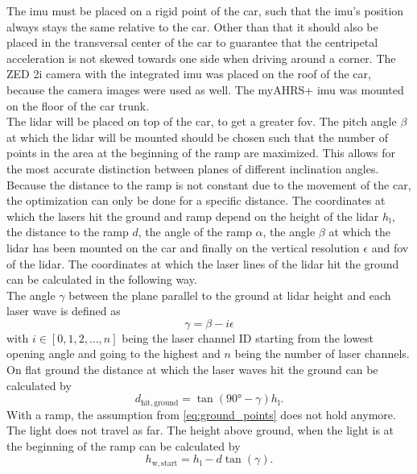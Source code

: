 The \gls{imu} must be placed on a rigid point of the car, such that the \gls{imu}'s position always stays the same relative to the car.
Other than that it should also be placed in the transversal center of the car to guarantee that the centripetal acceleration is not skewed towards one side when driving around a corner.
The ZED 2i camera with the integrated \gls{imu} was placed on the roof of the car, because the camera images were used as well.
The myAHRS+ \gls{imu} was mounted on the floor of the car trunk.\\
The \gls{lidar} will be placed on top of the car, to get a greater \gls{fov}.
The pitch angle $\beta$ at which the \gls{lidar} will be mounted should be chosen such that the number of points in the area at the beginning of the ramp are maximized.
This allows for the most accurate distinction between planes of different inclination angles.
Because the distance to the ramp is not constant due to the movement of the car, the optimization can only be done for a specific distance.
The coordinates at which the lasers hit the ground and ramp depend on the height of the \gls{lidar} $h_\mathrm{l}$, the distance to the ramp $d$, the angle of the ramp $\alpha$, the angle $\beta$ at which the \gls{lidar} has been mounted on the car and finally on the vertical resolution $\epsilon$ and \gls{fov} of the \gls{lidar}.
The coordinates at which the laser lines of the \gls{lidar} hit the ground can be calculated in the following way.\\
The angle $\gamma$ between the plane parallel to the ground at \gls{lidar} height and each laser wave is defined as
\begin{equation}
	\gamma = \beta - i\epsilon
\end{equation}
with $i \in [0,1,2,\dots,n]$ being the laser channel ID starting from the lowest opening angle and going to the highest and $n$ being the number of laser channels.
On flat ground the distance at which the laser waves hit the ground can be calculated by
\begin{equation}
	d_\mathrm{hit,ground}  = \tan(\ang{90} - \gamma) h_\mathrm{l}.
	\label{eq:ground_points}
\end{equation}
With a ramp, the assumption from \cref{eq:ground_points} does not hold anymore.
The light does not travel as far.
The height above ground, when the light is at the beginning of the ramp can be calculated by
\begin{equation}
	h_\mathrm{w,start} = h_\mathrm{l} - d\tan(\gamma).
\end{equation}
